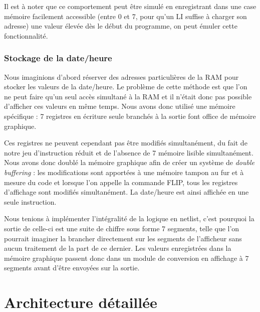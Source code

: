 \documentclass{article}
\begin{document}
Il est à noter que ce comportement peut être simulé en enregistrant dans une case
mémoire facilement accessible (entre 0 et 7, pour qu'un LI suffise à charger son
adresse) une valeur élevée dès le début du programme, on peut émuler cette fonctionnalité.

\subsubsection{Stockage de la date/heure}
Nous imaginions d'abord réserver des adresses particulières de la RAM pour
stocker les valeurs de la date/heure. Le problème de cette méthode est que l'on
ne peut faire qu'un seul accès simultané à la RAM et il n'était donc pas possible
d'afficher ces valeurs en même temps. Nous avons donc utilisé une mémoire
spécifique : 7 registres en écriture seule branchés à la sortie font office
de mémoire graphique.

Ces registres ne peuvent cependant pas être modifiés simultanément, du fait de
notre jeu d'instruction réduit et de l'absence de 7 mémoire lisible simultanément.
Nous avons donc doublé la mémoire graphique afin de créer un système de \emph{double
buffering} : les modifications sont apportées à une mémoire tampon au fur et à mesure
du code et lorsque l'on appelle la commande FLIP, tous les registres d'affichage
sont modifiés simultanément. La date/heure est ainsi affichée en une seule instruction.

Nous tenions à implémenter l'intégralité de la logique en netlist, c'est pourquoi
la sortie de celle-ci est une suite de chiffre sous forme 7 segments, telle que l'on
pourrait imaginer la brancher directement sur les segments de l'afficheur sans
aucun traitement de la part de ce dernier. Les valeurs enregistrées dans la mémoire
graphique passent donc dans un module de conversion en affichage à 7 segments avant
d'être envoyées sur la sortie.


\section{Architecture détaillée}
\end{document}
